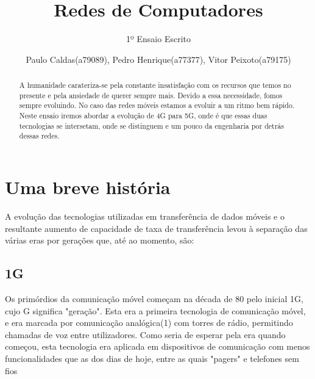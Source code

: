 \documentclass{llncs}
\begin{document}
\title{Redes de Computadores}
\subtitle{1º Ensaio Escrito}
%
\author{Paulo Caldas(a79089), Pedro Henrique(a77377), Vitor Peixoto(a79175)}
%



\maketitle              %

\begin{abstract}
    A humanidade carateriza-se pela constante insatisfação com os recursos que temos no presente e pela ansiedade de querer sempre mais. Devido a essa necessidade, fomos sempre evoluindo. No caso das redes móveis estamos a evoluir a um ritmo bem rápido. Neste ensaio iremos abordar a evolução de 4G para 5G, onde é que essas duas tecnologias se intersetam, onde se distinguem e um pouco da engenharia por detrás dessas redes.
\end{abstract}
%
\section{Uma breve história}
\hspace*{1.5em}A evolução das tecnologias utilizadas em transferência de dados móveis e o resultante aumento de capacidade de taxa de transferência levou à separação das várias eras por gerações que, até ao momento, são:
\subsection{1G}
\hspace*{1.5em}Os primórdios da comunicação móvel começam na década de 80 pelo inicial 1G, cujo G significa "geração". Esta era a primeira tecnologia de comunicação móvel, e era marcada por comunicação analógica(1) com torres de rádio, permitindo chamadas de voz entre utilizadores. Como seria de esperar pela era quando começou, esta tecnologia era aplicada em dispositivos de comunicação com menos funcionalidades que as dos dias de hoje, entre as quais "pagers" e telefones sem fios \cite{Ton:Pan:Kus}
\end{document}
